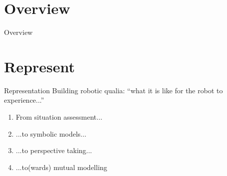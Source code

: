 \documentclass[compress]{beamer}
\begin{document}


\section*{Overview}
\begin{frame}{Overview}
    \tableofcontents[hideallsubsections]
\end{frame}




\section{Represent}



\begin{frame}{Representation}
    Building robotic qualia: ``what it is like for the robot to experience...''
    \begin{enumerate}
        \item From situation assessment...
        \item ...to symbolic models...
        \item ...to perspective taking...
        \item ...to(wards) mutual modelling
   \end{enumerate}

\end{frame}
\end{document}
